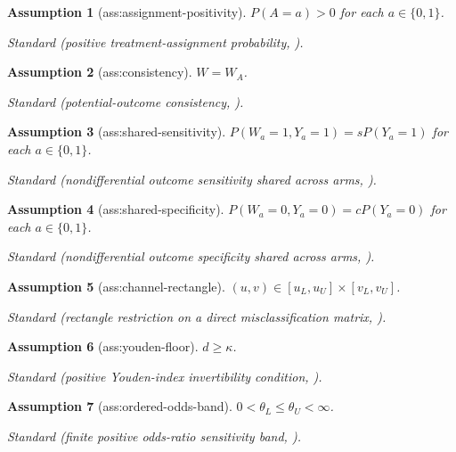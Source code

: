 \documentclass{article}
\newtheorem{assumption}{Assumption}
\begin{document}
\begin{assumption}[ass:assignment-positivity]\label{ass:assignment-positivity}
\(P(A=a)>0\) for each \(a\in\{0,1\}\).
\par\smallskip\noindent\emph{Standard} (positive treatment-assignment probability, \cite{Rubin1974}).
\end{assumption}

\begin{assumption}[ass:consistency]\label{ass:consistency}
\(W=W_A\).
\par\smallskip\noindent\emph{Standard} (potential-outcome consistency, \cite{Rubin1974}).
\end{assumption}

\begin{assumption}[ass:shared-sensitivity]\label{ass:shared-sensitivity}
\(P(W_a=1,Y_a=1)=sP(Y_a=1)\) for each \(a\in\{0,1\}\).
\par\smallskip\noindent\emph{Standard} (nondifferential outcome sensitivity shared across arms, \cite{EdwardsZivichShookSaCole2026}).
\end{assumption}

\begin{assumption}[ass:shared-specificity]\label{ass:shared-specificity}
\(P(W_a=0,Y_a=0)=cP(Y_a=0)\) for each \(a\in\{0,1\}\).
\par\smallskip\noindent\emph{Standard} (nondifferential outcome specificity shared across arms, \cite{EdwardsZivichShookSaCole2026}).
\end{assumption}

\begin{assumption}[ass:channel-rectangle]\label{ass:channel-rectangle}
\((u,v)\in[u_L,u_U]\times[v_L,v_U]\).
\par\smallskip\noindent\emph{Standard} (rectangle restriction on a direct misclassification matrix, \cite{Molinari2008}).
\end{assumption}

\begin{assumption}[ass:youden-floor]\label{ass:youden-floor}
\(d\ge\kappa\).
\par\smallskip\noindent\emph{Standard} (positive Youden-index invertibility condition, \cite{EdwardsZivichShookSaCole2026}).
\end{assumption}

\begin{assumption}[ass:ordered-odds-band]\label{ass:ordered-odds-band}
\(0<\theta_L\le\theta_U<\infty\).
\par\smallskip\noindent\emph{Standard} (finite positive odds-ratio sensitivity band, \cite{ZhangNieSoonLiu2013}).
\end{assumption}
\end{document}
